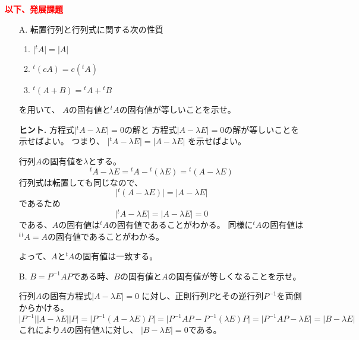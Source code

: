 \documentclass[10pt,b5paper]{ltjsarticle}
\begin{document}
\hrulefill

\textcolor{red}{\textbf{以下、発展課題}}
\begin{enumerate}
 \item[A. ] 転置行列と行列式に関する次の性質
            \begin{enumerate}
             \item $\lvert {}^{t}A\rvert = \lvert A\rvert $
             \item ${}^{t}(cA)=c({}^{t}A)$
             \item ${}^{t}(A+B) = {}^{t}A+{}^{t}B$
            \end{enumerate}
            を用いて、
            $A$の固有値と${}^{t}A$の固有値が等しいことを示せ。

            \textbf{ヒント.}
            方程式$\lvert {}^{t}A -\lambda E\rvert = 0$の解と
            方程式$\lvert A -\lambda E\rvert = 0$の解が等しいことを示せばよい。
            つまり、
            $\lvert {}^{t}A -\lambda E\rvert = \lvert A -\lambda E\rvert$
            を示せばよい。

            \dotfill

            行列$A$の固有値を$\lambda$とする。
            \begin{equation}
             {}^{t}A -\lambda E
             = {}^{t}A -{}^{t}(\lambda E)
             = {}^{t}(A -\lambda E)
            \end{equation}
            行列式は転置しても同じなので、
            \begin{equation}
             \lvert {}^{t}(A -\lambda E) \rvert
              =\lvert A -\lambda E \rvert
            \end{equation}
            であるため
            \begin{equation}
             \lvert {}^{t}A -\lambda E \rvert
              =\lvert A -\lambda E \rvert
              =0
            \end{equation}
            である、$A$の固有値は${}^{t}A$の固有値であることがわかる。
            同様に${}^{t}A$の固有値は${}^{t}{}^{t}A=A$の固有値であることがわかる。

            よって、$A$と${}^{t}A$の固有値は一致する。
            
            \hrulefill
 \item[B. ] $B=P^{-1}AP$である時、$B$の固有値と$A$の固有値が等しくなることを示せ。

            \dotfill

            行列$A$の固有方程式$\lvert A - \lambda E\rvert =0$
            に対し、正則行列$P$とその逆行列$P^{-1}$を両側からかける。
            \begin{equation}
             \lvert P^{-1}\lvert \lvert A - \lambda E\rvert \lvert P\rvert
              =\lvert P^{-1}(A - \lambda E) P\rvert
              =\lvert P^{-1}AP - P^{-1}(\lambda E) P\rvert
              =\lvert P^{-1}AP - \lambda E\rvert
              =\lvert B - \lambda E\rvert
            \end{equation}
            これにより$A$の固有値$\lambda$に対し、
            $\lvert B - \lambda E\rvert =0$である。


\end{enumerate}
\end{document}
